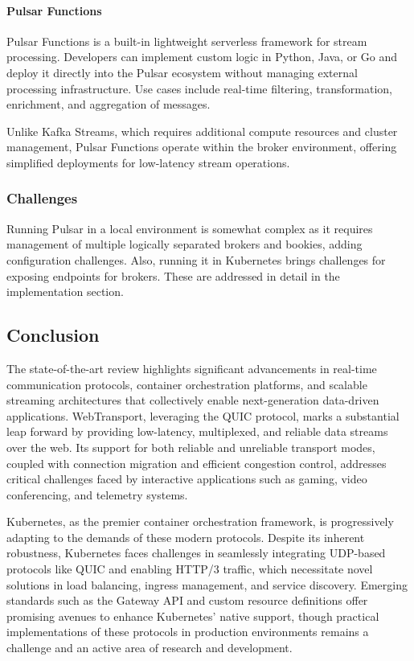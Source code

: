 \paragraph{Pulsar Functions}
Pulsar Functions is a built-in lightweight serverless framework for stream processing. Developers can implement custom logic in Python, Java, or Go and deploy it directly into the Pulsar ecosystem without managing external processing infrastructure. Use cases include real-time filtering, transformation, enrichment, and aggregation of messages.

Unlike Kafka Streams, which requires additional compute resources and cluster management, Pulsar Functions operate within the broker environment, offering simplified deployments for low-latency stream operations.

\subsubsection{Challenges}
Running Pulsar in a local environment is somewhat complex as it requires management of multiple logically separated brokers and bookies, adding configuration challenges. Also, running it in Kubernetes brings challenges for exposing endpoints for brokers. These are addressed in detail in the implementation section.

\subsection{Conclusion}
The state-of-the-art review highlights significant advancements in real-time communication protocols, container orchestration platforms, and scalable streaming architectures that collectively enable next-generation data-driven applications. WebTransport, leveraging the QUIC protocol, marks a substantial leap forward by providing low-latency, multiplexed, and reliable data streams over the web. Its support for both reliable and unreliable transport modes, coupled with connection migration and efficient congestion control, addresses critical challenges faced by interactive applications such as gaming, video conferencing, and telemetry systems.

Kubernetes, as the premier container orchestration framework, is progressively adapting to the demands of these modern protocols. Despite its inherent robustness, Kubernetes faces challenges in seamlessly integrating UDP-based protocols like QUIC and enabling HTTP/3 traffic, which necessitate novel solutions in load balancing, ingress management, and service discovery. Emerging standards such as the Gateway API and custom resource definitions offer promising avenues to enhance Kubernetes' native support, though practical implementations of these protocols in production environments remains a challenge and an active area of research and development.

